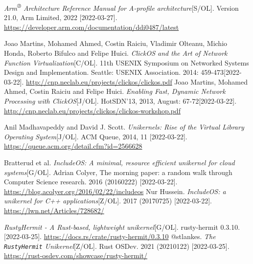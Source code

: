 \documentclass[UTF8,fontset=none,linespread=1.15]{ctexart}
\begin{document}
\begin{thebibliography}{99}
 \textit{Arm\textsuperscript{®} Architecture Reference Manual
for A-profile architecture}[S/OL]. Version 21.0, Arm Limited, 2022 [2022-03-27]. \url{https://developer.arm.com/documentation/ddi0487/latest}

 Joao Martins, Mohamed Ahmed, Costin Raiciu, Vladimir Olteanu,
Michio Honda, Roberto Bifulco and Felipe Huici. \textit{ClickOS and the Art of Network Function Virtualization}[C/OL]. 11th USENIX Symposium on Networked Systems
Design and Implementation. Seattle: USENIX Association. 2014: 459-473[2022-03-22]. \url{http://cnp.neclab.eu/projects/clickos/clickos.pdf}
 Joao Martins, Mohamed Ahmed, Costin Raiciu and Felipe Huici.
\textit{Enabling Fast, Dynamic Network Processing with ClickOS}[J/OL]. HotSDN'13, 2013, August: 67-72[2022-03-22]. \url{http://cnp.neclab.eu/projects/clickos/clickos-workshop.pdf}

 Anil Madhavapeddy and David J. Scott. \textit{Unikernels: Rise of the Virtual Library Operating System}[J/OL]. ACM Queue, 2014, 11 [2022-03-22].  \url{https://queue.acm.org/detail.cfm?id=2566628}

  Bratterud et al. \textit{IncludeOS: A minimal, resource efficient unikernel for cloud systems}[G/OL]. Adrian Colyer, The morning paper: a random walk through Computer Science research. 2016 (20160222) [2022-03-22]. \url{https://blog.acolyer.org/2016/02/22/includeos}
 Nur Hussein. \textit{IncludeOS: a unikernel for C++ applications}[Z/OL]. 2017 (20170725) [2022-03-22]. \url{https://lwn.net/Articles/728682/}

 \textit{RustyHermit - A Rust-based, lightweight unikernel}[G/OL]. rusty-hermit 0.3.10. [2022-03-25]. \url{https://docs.rs/crate/rusty-hermit/0.3.10}
 @stlankes. \textit{The \texttt{RustyHermit} Unikernel}[Z/OL]. Rust OSDev. 2021 (20210122) [2022-03-25]. \url{https://rust-osdev.com/showcase/rusty-hermit/}


\end{thebibliography}
\end{document}
